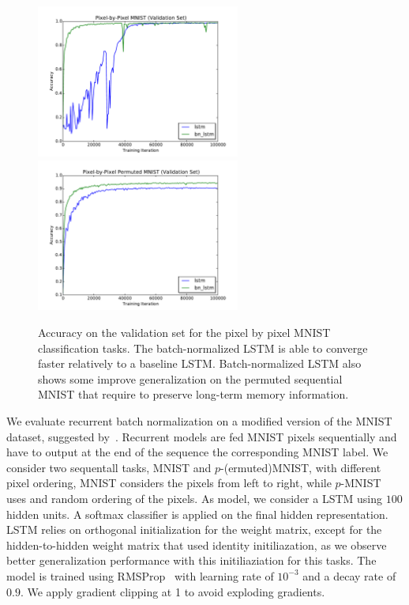 \documentclass{article} %
\begin{document}
\begin{figure}
\center
\includegraphics[width=6.7cm]{figures/unpermuted_valid.pdf}
\includegraphics[width=6.7cm]{figures/permuted_valid.pdf}
\caption{Accuracy on the validation set for the pixel by pixel MNIST classification tasks. The batch-normalized LSTM is able to converge faster relatively to a baseline LSTM.
  Batch-normalized  LSTM also shows some improve generalization on the permuted sequential MNIST that require to preserve long-term memory information.}
\label{fig:seqmnist_valid}
\end{figure}


We evaluate recurrent batch normalization on a modified version of the MNIST dataset, suggested by~\cite{le2015simple}.
Recurrent models are fed MNIST pixels sequentially and have to output at the end of the sequence the corresponding MNIST label.
We consider two sequentall tasks, MNIST and $p$-(ermuted)MNIST, with different pixel ordering, MNIST considers the pixels from left to right, while $p$-MNIST uses and random ordering of the pixels.
As model, we consider a LSTM using $100$ hidden units. A softmax classifier
is applied on the final hidden representation.
LSTM relies on orthogonal initialization for the weight matrix, except for the hidden-to-hidden weight matrix that used identity initiliazation, as we observe better generalization performance with this
initiliaziation for this tasks.
The model is trained using RMSProp~\cite{rmsprop} with learning rate of $10^{-3}$ and a decay rate of $0.9$. We apply gradient clipping at 1 to avoid exploding gradients.
\end{document}
